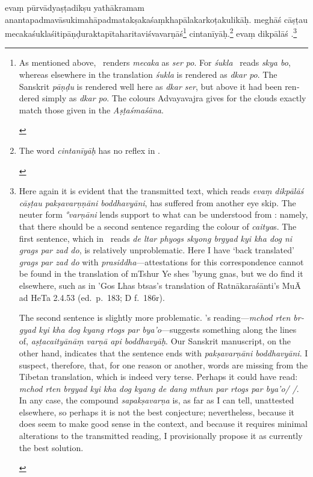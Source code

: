 \documentclass[naipra.tex]{subfiles}
\begin{document}
\begin{sanskrit}
\pstart
evaṃ pūrvādyaṣṭadikṣu yathākramam ananta\dsh padma\dsh vāsuki\dsh mahāpadma\dsh takṣaka\dsh śaṃkhapāla\dsh karkoṭa\dsh kulikāḥ.
meghāś cāṣṭau mecaka\dsh śukla\dsh śiti\dsh pāṇḍu\dsh rakta\dsh pīta\dsh harita\dsh viśvavarṇāś\footnote{
	\begin{english}%
		As mentioned above, \TIB\ renders \emph{mecaka} as \emph{ser po}.
		For \emph{śukla} \TIB\ reads \emph{skya bo}, whereas elsewhere in the translation \emph{śukla} is rendered as \emph{dkar po}.
		The Sanskrit \emph{pāṇḍu} is rendered well here as \emph{dkar ser}, but above it had been rendered simply as \emph{dkar po}.
		The colours Advayavajra gives for the clouds exactly match those given in the \emph{Aṣṭaśmaśāna}.
	\end{english}
} cintanīyāḥ.\footnote{
	\begin{english}%
		The word \emph{cintanīyāḥ} has no reflex in \TIB .
	\end{english}
}
evaṃ dikpālāś  .\footnote{
	\begin{english}%
		Here again it is evident that the transmitted text, which reads \emph{evaṃ dikpālāś cāṣṭau pakṣavarṇṇāni boddhavyāni}, has suffered from another eye skip.
		The neuter form \emph{°varṇāni} lends support to what can be understood from \TIB : namely, that there should be a second sentence regarding the colour of \emph{caitya}s.
		The first sentence, which in \TIB\ reads \emph{de ltar phyogs skyong brgyad kyi kha dog ni grags par zad do}, is relatively unproblematic.
		Here I have `back translated' \emph{grags par zad do} with \emph{prasiddha}—attestations for this correspondence cannot be found in the translation of mTshur Ye shes 'byung gnas, but we do find it elsewhere, such as in 'Gos Lhas btsas's translation of Ratnākaraśānti's MuĀ ad HeTa 2.4.53 (ed.\ p.\ 183; D f.\ 186r).

		The second sentence is slightly more problematic. \TIB 's reading—\emph{mchod rten brgyad kyi kha dog kyang rtogs par bya'o}—suggests something along the lines of, \emph{aṣṭacaityānāṃ varṇā api boddhavyāḥ}.
		Our Sanskrit manuscript, on the other hand, indicates that the sentence ends with \emph{pakṣavarṇāni boddhavyāni}.
		I suspect, therefore, that, for one reason or another, words are missing from the Tibetan translation, which is indeed very terse.
		Perhaps it could have read: \emph{mchod rten brgyad kyi kha dog kyang de dang mthun par rtogs par bya'o/ /}.
		In any case, the compound \emph{sapakṣavarṇa} is, as far as I can tell, unattested elsewhere, so perhaps it is not the best conjecture; nevertheless, because it does seem to make good sense in the context, and because it requires minimal alterations to the transmitted reading, I provisionally propose it as currently the best solution. 
	\end{english}
}
\pend


\end{sanskrit}
\end{document}
